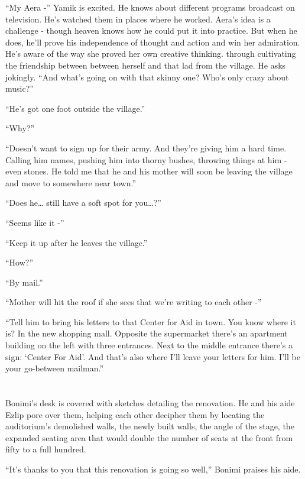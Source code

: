 \documentclass[twoside,11pt]{book}
\begin{document}
``My Aera -'' Yamik is excited. He knows about different programs broadcast on television.
He's watched them in places where he worked. Aera's idea is a challenge -\newline
though heaven knows how he could put it into practice. But when he does, he'll prove his independence of thought and
action and win her admiration. He's aware of the way she proved her own creative thinking. through
cultivating the friendship between between herself and that lad from the village. He asks jokingly. ``And
what's going on with that skinny one? Who's only crazy about music?''

``He's got one foot outside the village.''

``Why?''

``Doesn't want to sign up for their army. And they're giving him a hard time. Calling him names, pushing
him into thorny bushes, throwing things at him - even stones.  He told me that he and his mother will soon be leaving
the village and move to somewhere near town.''

``Does he{\dots} still have a soft spot for you{\dots}?''

``Seems like it -''

``Keep it up after he leaves the village.''

``How?''

``By mail.''

``Mother will hit the roof if she sees that we're writing to each other -''

``Tell him to bring his letters to that Center for Aid in town. You know where it is? In the new shopping
mall. Opposite the supermarket there's an apartment building on the left with three entrances. Next to the middle
entrance there's a sign: `Center For Aid'. And that's also where I'll leave your letters for him. I'll be your
go-between mailman.''



\chapter{}

Bonimi's  desk is covered with sketches detailing the renovation. He and his aide Ezlip pore over
them, helping each other  decipher them by locating the auditorium's demolished walls, the newly built walls, the angle
of the stage, the expanded seating area that would double the number of seats at the front from fifty to a
full hundred.

``It's thanks to you that this renovation is going so well,'' Bonimi praises his aide.
\end{document}
